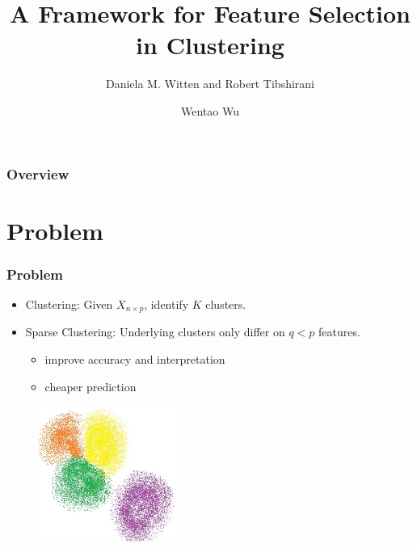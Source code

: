 \documentclass{beamer}
\title[Sparse Clustering]{A Framework for Feature Selection in Clustering} %
\author{Daniela M. Witten and Robert Tibshirani} %
\institute[] %
{
Stanford University \\ %
\medskip
\textit{} %
}
\date{Wentao Wu} %
\begin{document}
\begin{frame}
\titlepage %
\end{frame}

\begin{frame}
\frametitle{Overview} %
\tableofcontents %
\end{frame}


\section{Problem} %

\begin{frame}
\frametitle{Problem}

\begin{itemize}
    \item Clustering: Given $X_{n\times p}$, identify $K$ clusters.
    \item Sparse Clustering: Underlying clusters only differ on $q < p$ features.
          \begin{itemize}
            \item improve accuracy and interpretation
            \item cheaper prediction
          \end{itemize}
\end{itemize}

\begin{figure}[h!]
  \centering
    \includegraphics[width=0.4\textwidth]{cluster.jpeg}
\end{figure}


\end{frame}
\end{document}
